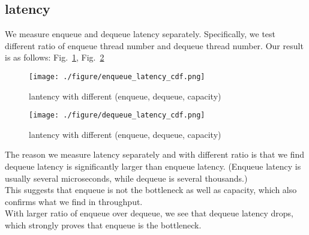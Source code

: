 \documentclass[12pt,a4paper]{article}
\begin{document}
\subsection{latency}
We measure enqueue and dequeue latency separately. Specifically, we test different ratio
of enqueue thread number and dequeue thread number. Our result is as follows: Fig.~\ref{enqueue},
Fig.~\ref{dequeue}
\begin{figure}[htbp!]
    \begin{center}
        \texttt{[image: ./figure/enqueue\_latency\_cdf.png]}
    \end{center}
    \caption{lantency with different (enqueue, dequeue, capacity)}
    \label{enqueue}
\end{figure}
\begin{figure}[htbp!]
    \begin{center}
        \texttt{[image: ./figure/dequeue\_latency\_cdf.png]}
    \end{center}
    \caption{lantency with different (enqueue, dequeue, capacity)}
    \label{dequeue}
\end{figure}
The reason we measure latency separately and with different ratio is that we find dequeue
latency is significantly larger than enqueue latency. (Enqueue latency is usually several
microseconds, while dequeue is several thousands.)\\
This suggests that enqueue is not the bottleneck as well as capacity, which also confirms
what we find in throughput.\\
With larger ratio of enqueue over dequeue, we see that dequeue latency drops, which
strongly proves that enqueue is the bottleneck.
\end{document}
